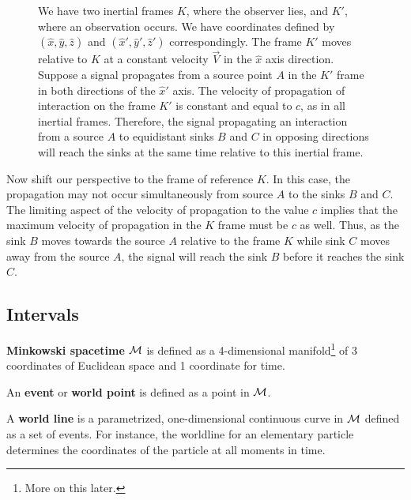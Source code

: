 \documentclass{article}
\begin{document}
\begin{exmp}
\begin{figure}[h]
\begin{subfigure}{0.4\textwidth}
\begin{tikzpicture}[scale=1]
						\end{tikzpicture}
					\end{subfigure}
					\hfill
					\begin{minipage}{0.56\columnwidth}
						\begin{spacing}{1.5}
							We have two inertial frames $K$, where the observer lies, and $K'$, where an observation occurs. We have coordinates defined by $(\hat{x},\hat{y},\hat{z})$ and $(\hat{x}',\hat{y}',\hat{z}')$ correspondingly. The frame $K'$ moves relative to $K$ at a constant velocity $\vec{V}$ in the $\hat{x}$ axis direction. Suppose a signal propagates from a source point $A$ in the $K'$ frame in both directions of the $\hat{x}'$ axis. The velocity of propagation of interaction on the frame $K'$ is constant and equal to $c$, as in all inertial frames. Therefore, the signal propagating an interaction from a source $A$ to equidistant sinks $B$ and $C$ in opposing directions will reach the sinks at the same time relative to this inertial frame.
						\end{spacing}
					\end{minipage}
				\end{figure}
				
				Now shift our perspective to the frame of reference $K$. In this case, the propagation may not occur simultaneously from source $A$ to the sinks $B$ and $C$. The limiting aspect of the velocity of propagation to the value $c$ implies that the maximum velocity of propagation in the $K$ frame must be $c$ as well. Thus, as the sink $B$ moves towards the source $A$ relative to the frame $K$ while sink $C$ moves away from the source $A$, the signal will reach the sink $B$ before it reaches the sink $C$.
			
			\end{exmp}
		\subsection{Intervals}
			\begin{defn}
				\textbf{Minkowski spacetime} $\M$ is defined as a 4-dimensional manifold\footnote{More on this later.} of 3 coordinates of Euclidean space and 1 coordinate for time.
			\end{defn}
			\begin{defn}
				An \textbf{event} or \textbf{world point} is defined as a point in $\M$. 
			\end{defn}
			\begin{defn}
				A \textbf{world line} is a parametrized, one-dimensional continuous curve in $\M$ defined as a set of events. For instance, the worldline for an elementary particle determines the coordinates of the particle at all moments in time.
			\end{defn}
			
\end{document}
